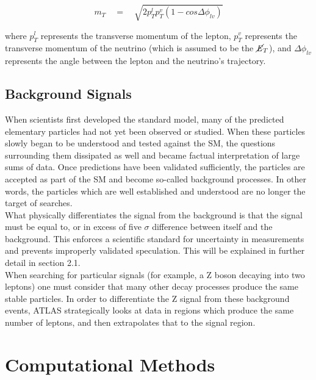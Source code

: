 \documentclass[runningheads,a4paper]{llncs}
\begin{document}
\begin{equation}
{ m }_{ T }\quad =\quad \sqrt { 2{ p }_{ T }^{ l }{ p }_{ T }^{ v }(1-cos\Delta { \phi  }_{ lv }) }
\end{equation}
 
where ${ p }_{ T }^{ l }$ represents the transverse momentum of the lepton, ${ p }_{ T }^{ v }$ represents the transverse momentum of the neutrino (which is assumed to be the $\cancel{\it{E}}_{T}$), and $\Delta { \phi  }_{ lv }$ represents the angle between the lepton and the neutrino’s trajectory. \\

\subsection{Background Signals}

When scientists first developed the standard model, many of the predicted elementary particles had not yet been observed or studied. When these particles slowly began to be understood and tested against the SM, the questions surrounding them dissipated as well and became factual interpretation of large sums of data. Once predictions have been validated sufficiently, the particles are accepted as part of the SM and become so-called background processes. In other words, the particles which are well established and understood are no longer the target of searches.\\

What physically differentiates the signal from the background is that the signal must be equal to, or in excess of five $\sigma$ difference between itself and the background. This enforces a scientific standard for uncertainty in measurements and prevents improperly validated speculation. This will be explained in further detail in section 2.1.\\

When searching for particular signals (for example, a Z boson decaying into two leptons) one must consider that many other decay processes produce the same stable particles. In order to differentiate the Z signal from these background events, ATLAS strategically looks at data in regions which produce the same number of leptons, and then extrapolates that to the signal region.\\



\section{Computational Methods}
\end{document}

